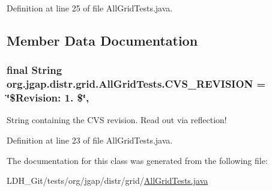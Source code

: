 Definition at line 25 of file All\-Grid\-Tests.\-java.



\subsection{Member Data Documentation}
\hypertarget{classorg_1_1jgap_1_1distr_1_1grid_1_1_all_grid_tests_abb279d96897ec4ff9cc1d1160fd75ce5}{
\subsubsection[{C\-V\-S\-\_\-\-R\-E\-V\-I\-S\-I\-O\-N}]{\setlength{\rightskip}{0pt plus 5cm}final String org.\-jgap.\-distr.\-grid.\-All\-Grid\-Tests.\-C\-V\-S\-\_\-\-R\-E\-V\-I\-S\-I\-O\-N = \char`\"{}\$Revision\-: 1. \$\char`\"{}\hspace{0.3cm}{\ttfamily [static]}, {\ttfamily [private]}}}\label{classorg_1_1jgap_1_1distr_1_1grid_1_1_all_grid_tests_abb279d96897ec4ff9cc1d1160fd75ce5}
String containing the C\-V\-S revision. Read out via reflection! 

Definition at line 23 of file All\-Grid\-Tests.\-java.



The documentation for this class was generated from the following file\-:\begin{DoxyCompactItemize}
\item 
L\-D\-H\-\_\-\-Git/tests/org/jgap/distr/grid/\hyperlink{_all_grid_tests_8java}{All\-Grid\-Tests.\-java}\end{DoxyCompactItemize}
